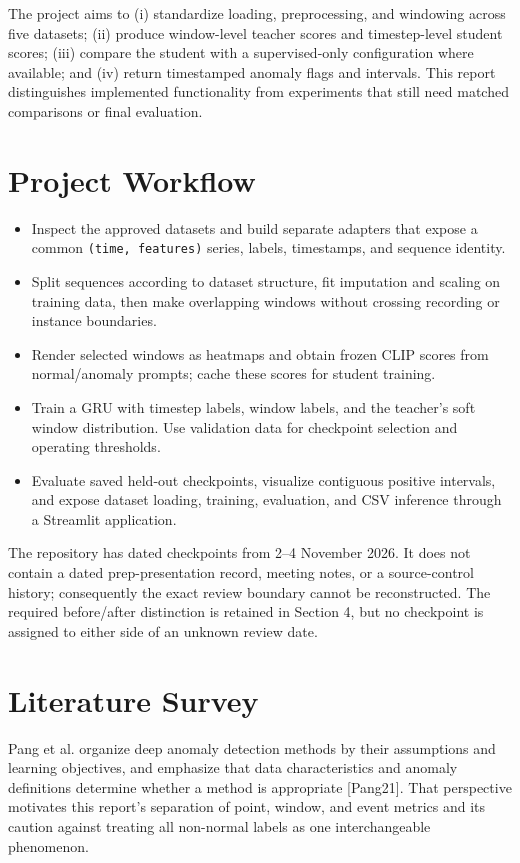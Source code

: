 \documentclass[twoside,english]{article}
\renewcommand{\cite}[1]{[#1]}
\begin{document}
The project aims to (i) standardize loading, preprocessing, and windowing across five datasets; (ii) produce window-level teacher scores and timestep-level student scores; (iii) compare the student with a supervised-only configuration where available; and (iv) return timestamped anomaly flags and intervals. This report distinguishes implemented functionality from experiments that still need matched comparisons or final evaluation.

\section{Project Workflow}
\begin{itemize}[leftmargin=*,nosep]
\item Inspect the approved datasets and build separate adapters that expose a common \texttt{(time, features)} series, labels, timestamps, and sequence identity.
\item Split sequences according to dataset structure, fit imputation and scaling on training data, then make overlapping windows without crossing recording or instance boundaries.
\item Render selected windows as heatmaps and obtain frozen CLIP scores from normal/anomaly prompts; cache these scores for student training.
\item Train a GRU with timestep labels, window labels, and the teacher's soft window distribution. Use validation data for checkpoint selection and operating thresholds.
\item Evaluate saved held-out checkpoints, visualize contiguous positive intervals, and expose dataset loading, training, evaluation, and CSV inference through a Streamlit application.
\end{itemize}

The repository has dated checkpoints from 2--4 November 2026. It does not contain a dated prep-presentation record, meeting notes, or a source-control history; consequently the exact review boundary cannot be reconstructed. The required before/after distinction is retained in Section 4, but no checkpoint is assigned to either side of an unknown review date.

\section{Literature Survey} \label{sec:litsurvey}
Pang et al. organize deep anomaly detection methods by their assumptions and learning objectives, and emphasize that data characteristics and anomaly definitions determine whether a method is appropriate \cite{Pang21}. That perspective motivates this report's separation of point, window, and event metrics and its caution against treating all non-normal labels as one interchangeable phenomenon.
\end{document}

